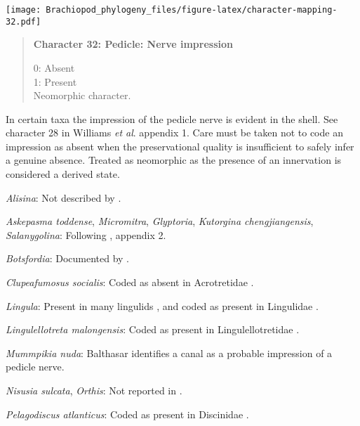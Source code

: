 \documentclass[openany]{book}
\theoremstyle{definition}
\theoremstyle{definition}
\theoremstyle{definition}
\theoremstyle{remark}
\begin{document}
\texttt{[image: Brachiopod\_phylogeny\_files/figure-latex/character-mapping-32.pdf]}

\begin{quote}
\textbf{Character 32: Pedicle: Nerve impression}

0: Absent\\
1: Present\\
Neomorphic character.
\end{quote}

In certain taxa the impression of the pedicle nerve is evident in the
shell. See character 28 in Williams \emph{et al}.
\citeyearpar{Williams1998Thediversity} appendix 1. Care must be taken
not to code an impression as absent when the preservational quality is
insufficient to safely infer a genuine absence. Treated as neomorphic as
the presence of an innervation is considered a derived state.

\hypertarget{Alisina-coding-32}{}
\emph{Alisina}: Not described by
\citet{Williams2000LinguliformeaCraniiformea}.

\hypertarget{Askepasma_toddense-coding-32}{}
\emph{Askepasma toddense}, \emph{Micromitra}, \emph{Glyptoria},
\emph{Kutorgina chengjiangensis}, \emph{Salanygolina}: Following
\citet{Williams1998Thediversity}, appendix 2.

\hypertarget{Botsfordia-coding-32}{}
\emph{Botsfordia}: Documented by \citet{Skovsted2017Depthrelated}.

\hypertarget{Clupeafumosus_socialis-coding-32}{}
\emph{Clupeafumosus socialis}: Coded as absent in Acrotretidae
\citep[table 6]{Williams2000LinguliformeaCraniiformea}.

\hypertarget{Lingula-coding-32}{}
\emph{Lingula}: Present in many lingulids
\citep{Williams2000LinguliformeaCraniiformea}, and coded as present in
Lingulidae \citep[table 6]{Williams2000LinguliformeaCraniiformea}.

\hypertarget{Lingulellotreta_malongensis-coding-32}{}
\emph{Lingulellotreta malongensis}: Coded as present in
Lingulellotretidae \citep[table
6]{Williams2000LinguliformeaCraniiformea}.

\hypertarget{Mummpikia_nuda-coding-32}{}
\emph{Mummpikia nuda}: Balthasar
\citeyearpar[p.~274]{Balthasar2008iMummpikia} identifies a canal as a
probable impression of a pedicle nerve.

\hypertarget{Nisusia_sulcata-coding-32}{}
\emph{Nisusia sulcata}, \emph{Orthis}: Not reported in
\citet{Williams2000LinguliformeaCraniiformea}.

\hypertarget{Pelagodiscus_atlanticus-coding-32}{}
\emph{Pelagodiscus atlanticus}: Coded as present in Discinidae
\citep[table 6]{Williams2000LinguliformeaCraniiformea}.
\end{document}
